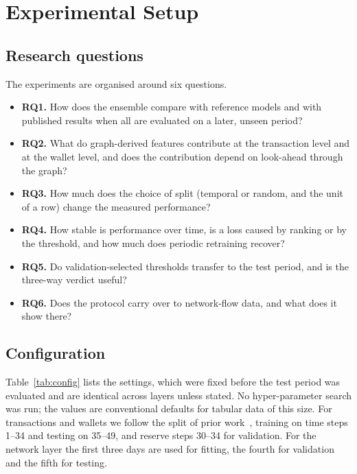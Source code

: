 \section{Experimental Setup}\label{sec:setup}

\subsection{Research questions}
The experiments are organised around six questions.
\begin{itemize}
\item \textbf{RQ1.} How does the ensemble compare with reference models and with published results when all are evaluated on a later, unseen period?
\item \textbf{RQ2.} What do graph-derived features contribute at the transaction level and at the wallet level, and does the contribution depend on look-ahead through the graph?
\item \textbf{RQ3.} How much does the choice of split (temporal or random, and the unit of a row) change the measured performance?
\item \textbf{RQ4.} How stable is performance over time, is a loss caused by ranking or by the threshold, and how much does periodic retraining recover?
\item \textbf{RQ5.} Do validation-selected thresholds transfer to the test period, and is the three-way verdict useful?
\item \textbf{RQ6.} Does the protocol carry over to network-flow data, and what does it show there?
\end{itemize}

\subsection{Configuration}
Table~\ref{tab:config} lists the settings, which were fixed before the test period was evaluated and are identical across layers unless stated. No hyper-parameter search was run; the values are conventional defaults for tabular data of this size. For transactions and wallets we follow the split of prior work~\cite{weber2019,elmougy2023}, training on time steps 1--34 and testing on 35--49, and reserve steps 30--34 for validation. For the network layer the first three days are used for fitting, the fourth for validation and the fifth for testing.

